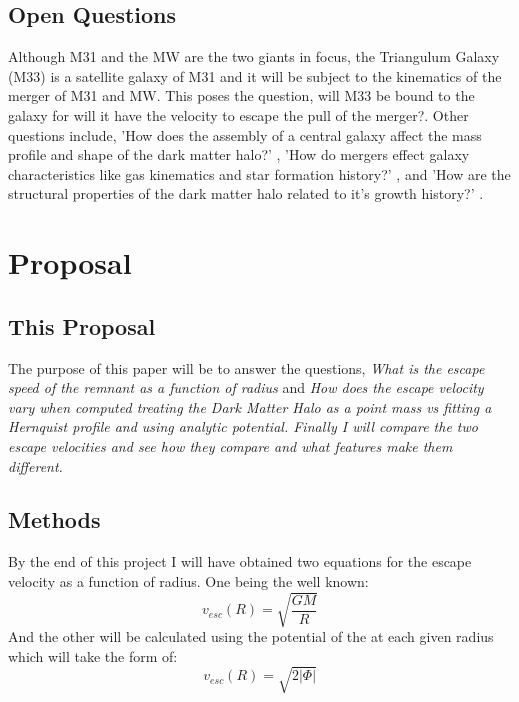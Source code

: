 \documentclass[fleqn,usenatbib]{mnras}
\begin{document}
\subsection{Open Questions}
Although M31 and the MW are the two giants in focus, the Triangulum Galaxy (M33) is a satellite galaxy of M31 and it will be subject to the kinematics of the merger of M31 and MW. This poses the question, will M33 be bound to the galaxy for will it have the velocity to escape the pull of the merger?. Other questions include, 'How does the assembly of a central galaxy affect the mass profile and shape of the dark matter halo?' \cite{Abadi2010MNRAS}, 'How do mergers effect galaxy characteristics like gas kinematics and star formation history?' \cite{Ejdetjärn2025}, and 'How are the structural properties of the dark matter halo related to it's growth history?' \cite{Drakos2019aMNRAS}.


\section{Proposal}

\subsection{This Proposal}
\label{sec:This Proposal}
The purpose of this paper will be to answer the questions, \textit{What is the escape speed of the remnant as a function of radius} and \textit{How does the escape velocity vary when computed treating the Dark Matter Halo as a point mass vs fitting a Hernquist profile and using analytic potential. Finally I will compare the two escape velocities and see how they compare and what features make them different. }
\subsection{Methods}
\label{sec:Methods}
By the end of this project I will have obtained two equations for the escape velocity as a function of radius. One being the well known:
\begin{equation}
    v_{esc}(R) = \sqrt{\frac{GM}{R}} \label{EQ1}
\end{equation}
And the other will be calculated using the potential of the at each given radius which will take the form of:
\begin{equation}
    v_{esc}(R) = \sqrt{2|\Phi|} \label{EQ2}
\end{equation}
\end{document}
